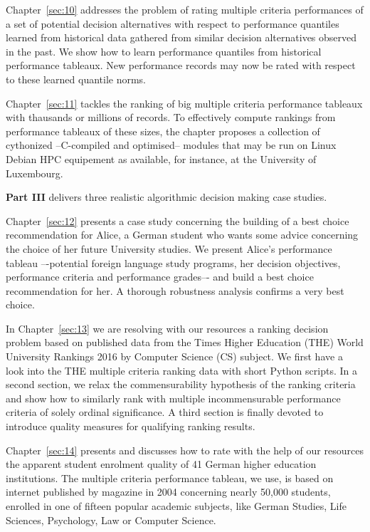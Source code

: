 Chapter~\vref{sec:10} addresses the problem of rating multiple criteria performances of a set of potential decision alternatives with respect to performance quantiles learned from historical data gathered from similar decision alternatives observed in the past. We show how to learn performance quantiles from historical performance tableaux. New performance records may now be rated with respect to these learned quantile norms.

Chapter~\vref{sec:11} tackles the ranking of big multiple criteria performance tableaux with thausands or millions of records. To effectively compute rankings from performance tableaux of these sizes, the chapter proposes a collection of cythonized --C-compiled and optimised-- modules that may be run on Linux Debian HPC equipement as available, for instance, at the University of Luxembourg.
\vspace{0.5cm}

\textbf{Part III} delivers three realistic algorithmic decision making case studies.

Chapter~\vref{sec:12} presents a case study concerning the building of a best choice recommendation for Alice, a German student who wants some advice concerning the choice of her future University studies. We present Alice’s performance tableau –-potential foreign language study programs, her decision objectives, performance criteria and performance grades–- and build a best choice recommendation for her. A thorough robustness analysis confirms a very best choice.

In Chapter~\vref{sec:13} we are resolving with our \Digraph resources a ranking decision problem based on published data from the Times Higher Education (THE) World University Rankings 2016 by Computer Science (CS) subject. We first have a look into the THE multiple criteria ranking data with short Python scripts. In a second section, we relax the commensurability hypothesis of the ranking criteria and show how to similarly rank with multiple incommensurable performance criteria of solely ordinal significance. A third section is finally devoted to introduce quality measures for qualifying ranking results.

Chapter~\vref{sec:14} presents and discusses how to rate with the help of our \Digraph resources the apparent student enrolment quality of 41 German higher education institutions. The multiple criteria performance tableau, we use, is based on internet published by \Spiegel magazine in 2004 concerning nearly 50,000 students, enrolled in one of fifteen popular academic subjects, like German Studies, Life Sciences, Psychology, Law or Computer Science.


